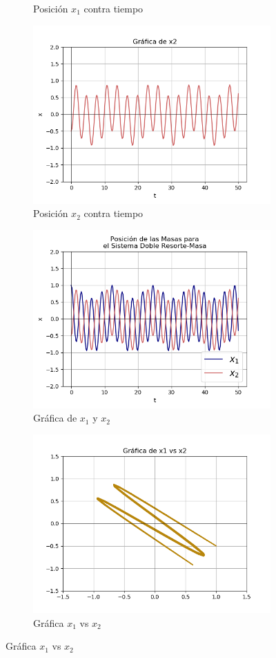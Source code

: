 \documentclass[12pt]{article}
\begin{document}
\begin{figure}[h!]
\begin{subfigure}{.55\textwidth}
  \caption{Posición $x_1$ contra tiempo}
  \label{fig:sfig2}
\end{subfigure}
\begin{subfigure}{.55\textwidth}
  \centering
  \includegraphics[width=.8\linewidth]{Ej3_14.png}
  \caption{Posición $x_2$ contra tiempo}
  \label{fig:sfig2}
\end{subfigure}
\begin{subfigure}{.55\textwidth}
  \centering
  \includegraphics[width=.8\linewidth]{Ej3_15.png}
  \caption{Gráfica de $x_1$ y $x_2$}
  \label{fig:sfig2}
\end{subfigure}
\begin{subfigure}{.55\textwidth}
  \centering
  \includegraphics[width=.8\linewidth]{Ej3_16.png}
  \caption{Gráfica $x_1$ vs $x_2$}
  \label{fig:sfig2}
\end{subfigure}
\end{figure}
\end{document}
